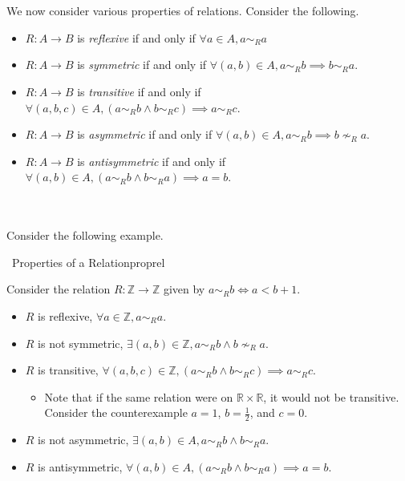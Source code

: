        \vphantom
        \\
        \\
        We now consider various properties of relations. Consider the following.
        \begin{itemize}
            \item \(R:A\to B\) is \textit{reflexive} if and only if \(\forall a\in A, a\sim_Ra\)
            \item \(R:A\to B\) is \textit{symmetric} if and only if \(\forall (a,b)\in A,a\sim_Rb\implies b\sim_Ra\).
            \item \(R:A\to B\) is \textit{transitive} if and only if \(\forall (a,b,c)\in A, (a\sim_Rb\wedge b\sim_Rc)\implies a\sim_Rc\).
            \item \(R:A\to B\) is \textit{asymmetric} if and only if \(\forall (a,b)\in A, a\sim_Rb\implies b\nsim_Ra\).
            \item \(R:A\to B\) is \textit{antisymmetric} if and only if \(\forall (a,b)\in A, (a\sim_Rb\wedge b\sim_Ra)\implies a=b\).
        \end{itemize}
        \vphantom
        \\
        \\
        Consider the following example.
        \begin{example}{\Difficulty\,\Difficulty\,\,Properties of a Relation}{proprel}
        
            Consider the relation \(R:\mathbb{Z}\to\mathbb{Z}\) given by \(a\sim_Rb\iff a<b+1\).
            \begin{itemize}
                \item \(R\) is reflexive, \(\forall a\in\mathbb{Z},a\sim_Ra\).
                \item \(R\) is not symmetric, \(\exists (a,b)\in\mathbb{Z},a\sim_Rb\wedge b\nsim_Ra\).
                \item \(R\) is transitive, \(\forall (a,b,c)\in\mathbb{Z},(a\sim_Rb\wedge b\sim_Rc)\implies a\sim_Rc\).
                \begin{itemize}
                    \item Note that if the same relation were on \(\mathbb{R}\times\mathbb{R}\), it would not be transitive. Consider the counterexample \(a=1\), \(b=\frac{1}{2}\), and \(c=0\).
                \end{itemize}
                \item \(R\) is not asymmetric, \(\exists(a,b)\in A,a\sim_Rb\wedge b\sim_Ra\).
                \item \(R\) is antisymmetric, \(\forall(a,b)\in A, (a\sim_Rb\wedge b\sim_Ra)\implies a=b\).
            \end{itemize}
        
        \end{example}
